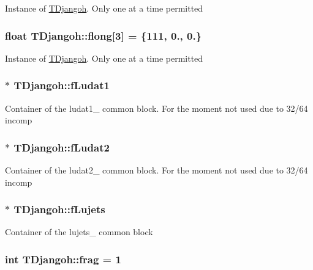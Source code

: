 Instance of \hyperlink{class_t_djangoh}{T\+Djangoh}. Only one at a time permitted \hypertarget{class_t_djangoh_a9eb43fe747243662ae9da94fb769a80b}{
\subsubsection[{flong}]{\setlength{\rightskip}{0pt plus 5cm}float T\+Djangoh\+::flong\mbox{[}3\mbox{]} = \{111, 0., 0.\}}}\label{class_t_djangoh_a9eb43fe747243662ae9da94fb769a80b}
Instance of \hyperlink{class_t_djangoh}{T\+Djangoh}. Only one at a time permitted \hypertarget{class_t_djangoh_acc9083c81e338f4e9bc3266e4536fde1}{
\subsubsection[{f\+Ludat1}]{$\ast$ T\+Djangoh\+::f\+Ludat1\hspace{0.3cm}{\ttfamily [protected]}}}\label{class_t_djangoh_acc9083c81e338f4e9bc3266e4536fde1}
Container of the ludat1\+\_\+ common block. For the moment not used due to 32/64 incomp \hypertarget{class_t_djangoh_af1cc34415736302400b5c343f8604e3b}{
\subsubsection[{f\+Ludat2}]{$\ast$ T\+Djangoh\+::f\+Ludat2\hspace{0.3cm}{\ttfamily [protected]}}}\label{class_t_djangoh_af1cc34415736302400b5c343f8604e3b}
Container of the ludat2\+\_\+ common block. For the moment not used due to 32/64 incomp \hypertarget{class_t_djangoh_a844cd27abcd743028fb98b3fba0c0fa9}{
\subsubsection[{f\+Lujets}]{$\ast$ T\+Djangoh\+::f\+Lujets\hspace{0.3cm}{\ttfamily [protected]}}}\label{class_t_djangoh_a844cd27abcd743028fb98b3fba0c0fa9}
Container of the lujets\+\_\+ common block \hypertarget{class_t_djangoh_ab7d3ea58eb6f4c59f68703e0b80614f9}{
\subsubsection[{frag}]{\setlength{\rightskip}{0pt plus 5cm}int T\+Djangoh\+::frag = 1}}\label{class_t_djangoh_ab7d3ea58eb6f4c59f68703e0b80614f9}
